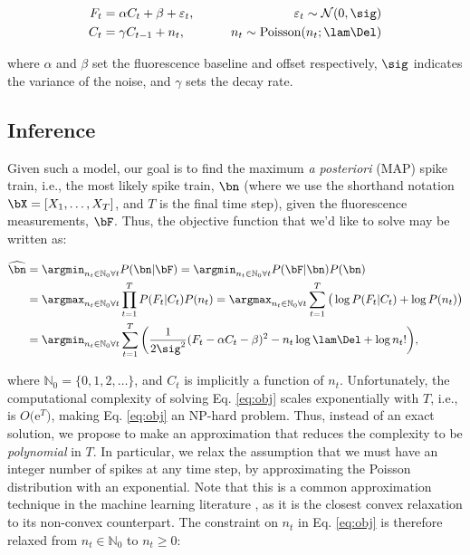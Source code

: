 \documentclass[12pt]{article}
\newcommand{\ann}{\argmin_{n_t \in \mathbb{N}_0 \forall t}}
\newcommand{\hnm}{\widehat{\bn}}
\begin{document}
\begin{align}
F_t &= \alpha C_t + \beta +  \varepsilon_t, \qquad &\varepsilon_t \sim \mathcal{N}(0,\sig) \label{eq:obs} \\
C_t  &= \gamma  C_{t-1} + n_t,  \qquad &n_t \sim \text{Poisson}(n_t; \lam \Del) \label{eq:trans}  
\end{align}

\noindent where $\alpha$ and $\beta$ set the fluorescence baseline and offset respectively, $\sig$ indicates the variance of the noise, and $\gamma$ sets the decay rate. %

\subsection{Inference} \label{sec:inf}

Given such a model, our goal is to find the maximum \emph{a posteriori} (MAP) spike train, i.e., the most likely spike train, $\bn$ (where we use the shorthand notation $\bX=[X_1, \ldots, X_T]$, and $T$ is the final time step),  given the fluorescence measurements, $\bF$. %
Thus, the objective function that we'd like to solve may be written as:

\begin{align}
\hnm &=  \ann P(\bn | \bF) = \ann P(\bF | \bn) P(\bn) \nonumber  \\
&= \argmax_{n_t \in \mathbb{N}_0 \forall t} \prod_{t=1}^T  P(F_t | C_t)  P(n_t) = \argmax_{n_t \in \mathbb{N}_0 \forall t} \sum_{t=1}^T \big( \log P(F_t | C_t) + \log P(n_t)\big)  \nonumber \\
&= \ann  \sum_{t=1}^T \bigg( \frac{1}{2 \sig^2}(F_t - \alpha C_t - \beta)^2  -  n_t \log \lam \Del + \log n_t! \bigg),   \label{eq:obj}
\end{align}

\noindent where $\mathbb{N}_0 = \{0, 1, 2, \ldots\}$, and $C_t$ is implicitly a function of $n_t$.  Unfortunately, the computational complexity of solving Eq. \eqref{eq:obj} scales exponentially with $T$, i.e., is $O($e$^T)$, making Eq. \eqref{eq:obj} an NP-hard problem.  Thus, instead of an exact solution, we propose to make an approximation that reduces the complexity to be \emph{polynomial} in $T$.  In particular, we relax the assumption that we must have an integer number of spikes at any time step, by approximating the Poisson distribution with an exponential.  Note that this is a common approximation technique in the machine learning literature \cite{HastieFriedman01}, as it is the closest convex relaxation to its non-convex counterpart.  The constraint on $n_t$ in Eq. \eqref{eq:obj} is therefore relaxed from  $n_t \in \mathbb{N}_0$ to $n_t \geq 0$:
\end{document}
